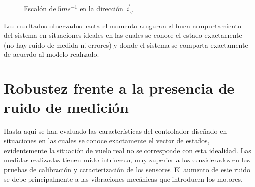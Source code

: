 \documentclass[main]{subfiles}
\begin{document}
\begin{figure}
  \centering
 
  \caption{Escal\'on de $5m s^{-1}$ en la direcci\'on $\vec{i}_q$}
  \label{fig:rec_esc_x}
\end{figure}

Los resultados observados hasta el momento aseguran el buen comportamiento del sistema en situaciones ideales en las cuales se conoce el estado exactamente (no hay ruido de medida ni errores) y donde el sistema se comporta exactamente de acuerdo al modelo realizado.\\

\section{Robustez frente a la presencia de ruido de medici\'on}

Hasta aqu\'i se han evaluado las caracter\'isticas del controlador diseñado en situaciones en las cuales se conoce exactamente el vector de estados, evidentemente la situaci\'on de vuelo real no se corresponde con esta idealidad. Las medidas realizadas tienen ruido intr\'inseco, muy superior a los considerados en las pruebas de calibraci\'on y caracterizaci\'on de los sensores. El aumento de este ruido se debe principalmente a las vibraciones mec\'anicas que introducen los motores.\\
\end{document}
